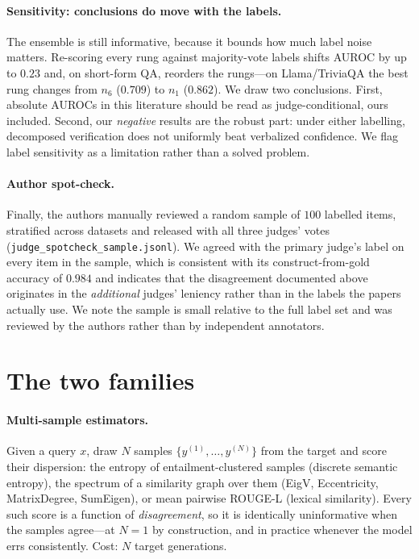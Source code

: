 \documentclass[11pt]{article}
\begin{document}
\paragraph{Sensitivity: conclusions do move with the labels.} The ensemble is still
informative, because it bounds how much label noise matters. Re-scoring every rung against
majority-vote labels shifts AUROC by up to $0.23$ and, on short-form QA, reorders the
rungs---on Llama/TriviaQA the best rung changes from $n_6$ ($0.709$) to $n_1$ ($0.862$). We
draw two conclusions. First, absolute AUROCs in this literature should be read as
judge-conditional, ours included. Second, our \emph{negative} results are the robust part:
under either labelling, decomposed verification does not uniformly beat verbalized confidence.
We flag label sensitivity as a limitation rather than a solved problem.

\paragraph{Author spot-check.} Finally, the authors manually reviewed a random sample of $100$
labelled items, stratified across datasets and released with all three judges' votes
(\texttt{judge\_spotcheck\_sample.jsonl}). We agreed with the primary judge's label on every
item in the sample, which is consistent with its construct-from-gold accuracy of $0.984$ and
indicates that the disagreement documented above originates in the \emph{additional} judges'
leniency rather than in the labels the papers actually use. We note the sample is small
relative to the full label set and was reviewed by the authors rather than by independent
annotators.

\section{The two families}\label{sec:method}
\paragraph{Multi-sample estimators.} Given a query $x$, draw $N$ samples
$\{y^{(1)},\dots,y^{(N)}\}$ from the target and score their dispersion: the entropy of
entailment-clustered samples (discrete semantic entropy), the spectrum of a similarity graph over
them (EigV, Eccentricity, MatrixDegree, SumEigen), or mean pairwise ROUGE-L (lexical similarity).
Every such score is a function of \emph{disagreement}, so it is identically uninformative when
the samples agree---at $N{=}1$ by construction, and in practice whenever the model errs
consistently. Cost: $N$ target generations.
\end{document}
